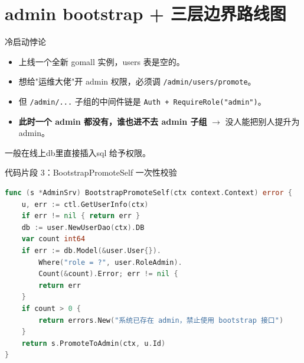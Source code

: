 \documentclass[aspectratio=169,11pt]{beamer}
\begin{document}
\section{admin bootstrap + 三层边界路线图}

\begin{frame}[shrink]{冷启动悖论}
\begin{itemize}
  \item 上线一个全新 gomall 实例，users 表是空的。
  \item 想给"运维大佬"开 admin 权限，必须调 \texttt{/admin/users/promote}。
  \item 但 \texttt{/admin/...} 子组的中间件链是 \texttt{Auth + RequireRole("admin")}。
  \item \textbf{此时一个 admin 都没有，谁也进不去 admin 子组} $\to$ 没人能把别人提升为 admin。
\end{itemize}
\vspace{2mm}
一般在线上db里直接插入sql 给予权限。
\end{frame}

\begin{frame}{代码片段 3：BootstrapPromoteSelf 一次性校验}
\begin{lstlisting}[language=Go,firstnumber=65,
  caption={}]
func (s *AdminSrv) BootstrapPromoteSelf(ctx context.Context) error {
    u, err := ctl.GetUserInfo(ctx)
    if err != nil { return err }
    db := user.NewUserDao(ctx).DB
    var count int64
    if err := db.Model(&user.User{}).
        Where("role = ?", user.RoleAdmin).
        Count(&count).Error; err != nil {
        return err
    }
    if count > 0 {
        return errors.New("系统已存在 admin，禁止使用 bootstrap 接口")
    }
    return s.PromoteToAdmin(ctx, u.Id)
}
\end{lstlisting}
\end{frame}
\end{document}
